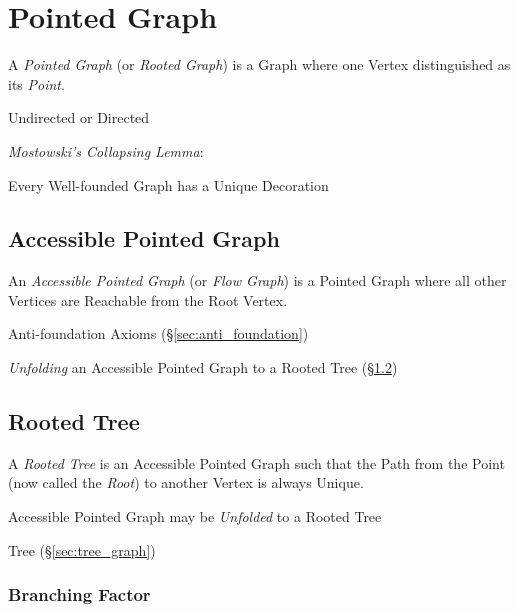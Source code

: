 \section{Pointed Graph}\label{sec:pointed_graph}

A \emph{Pointed Graph} (or \emph{Rooted Graph}) is a Graph where one
Vertex distinguished as its \emph{Point}.

Undirected or Directed

\emph{Mostowski's Collapsing Lemma}: \cite{aczel88}

Every Well-founded Graph has a Unique Decoration %



\subsection{Accessible Pointed Graph}\label{sec:accessible_pointed}

An \emph{Accessible Pointed Graph} (or \emph{Flow Graph}) is a Pointed
Graph where all other Vertices are Reachable from the Root Vertex.

Anti-foundation Axioms (\S\ref{sec:anti_foundation})

\emph{Unfolding} an Accessible Pointed Graph to a Rooted Tree
(\S\ref{sec:rooted_tree})



\subsection{Rooted Tree}\label{sec:rooted_tree}

A \emph{Rooted Tree} is an Accessible Pointed Graph such that the Path
from the Point (now called the \emph{Root}) to another Vertex is
always Unique.

Accessible Pointed Graph may be \emph{Unfolded} to a Rooted Tree

Tree (\S\ref{sec:tree_graph})



\subsubsection{Branching Factor}\label{sec:branching_factor}

